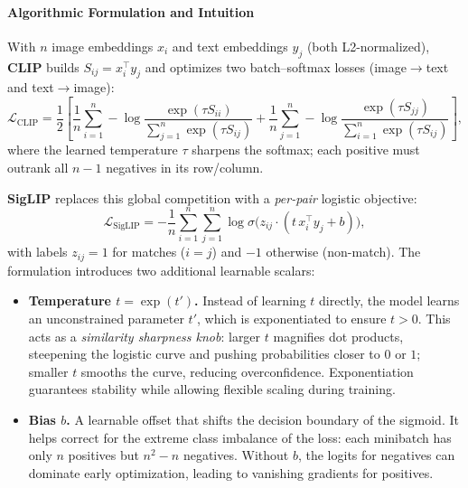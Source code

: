 \begin{enrichment}
\begin{enrichment}
        \paragraph{Algorithmic Formulation and Intuition}
        With $n$ image embeddings $x_i$ and text embeddings $y_j$ (both L2-normalized), \textbf{CLIP} builds $S_{ij}{=}x_i^\top y_j$ and optimizes two batch–softmax losses (image$\!\to\!$text and text$\!\to\!$image):
        \[
        \mathcal{L}_{\text{CLIP}}
        =\frac{1}{2}\!\left[
        \frac{1}{n}\sum_{i=1}^{n}\!-\log\frac{\exp(\tau S_{ii})}{\sum_{j=1}^{n}\exp(\tau S_{ij})}
        +
        \frac{1}{n}\sum_{j=1}^{n}\!-\log\frac{\exp(\tau S_{jj})}{\sum_{i=1}^{n}\exp(\tau S_{ij})}
        \right],
        \]
        where the learned temperature $\tau$ sharpens the softmax; each positive must outrank all $n{-}1$ negatives in its row/column.
        
        \textbf{SigLIP} replaces this global competition with a \emph{per-pair} logistic objective:
        \begin{equation}
            \label{eq:chapter24_siglip_loss}
            \mathcal{L}_{\text{SigLIP}}
            = -\frac{1}{n}\sum_{i=1}^{n}\sum_{j=1}^{n}
            \log\sigma\!\big(z_{ij}\cdot(t\,x_i^\top y_j + b)\big),
        \end{equation}
        with labels $z_{ij}{=}1$ for matches ($i{=}j$) and $-1$ otherwise (non-match). The formulation introduces two additional learnable scalars:
        \begin{itemize}
            \item \textbf{Temperature $t=\exp(t')$.} Instead of learning $t$ directly, the model learns an unconstrained parameter $t'$, which is exponentiated to ensure $t>0$. This acts as a \emph{similarity sharpness knob}: larger $t$ magnifies dot products, steepening the logistic curve and pushing probabilities closer to $0$ or $1$; smaller $t$ smooths the curve, reducing overconfidence. Exponentiation guarantees stability while allowing flexible scaling during training.
            \item \textbf{Bias $b$.} A learnable offset that shifts the decision boundary of the sigmoid. It helps correct for the extreme class imbalance of the loss: each minibatch has only $n$ positives but $n^2-n$ negatives. Without $b$, the logits for negatives can dominate early optimization, leading to vanishing gradients for positives.
        \end{itemize}
        

\end{enrichment}
\end{enrichment}
